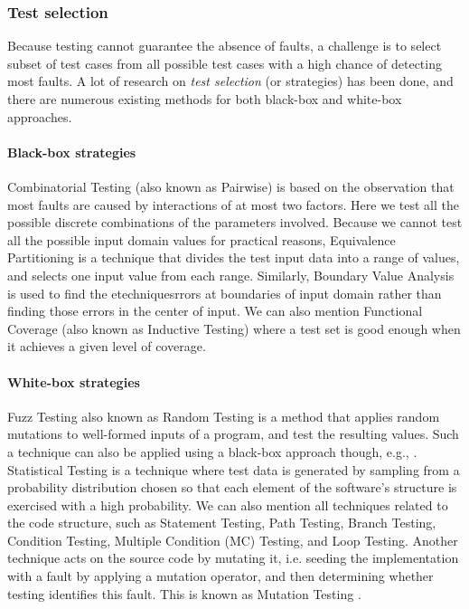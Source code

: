 \subsubsection{Test selection}

Because testing cannot guarantee the absence of faults, a
challenge is to select subset of test cases from all possible
test cases with a high chance of detecting most faults. A lot of
research on \textit{test selection} (or strategies) has been
done, and there are numerous existing methods for both black-box
and white-box approaches.

\paragraph{Black-box strategies} Combinatorial Testing (also
known as Pairwise) \cite{Tai98atest} is based on the observation
that most faults are caused by interactions of at most two
factors. Here we test all the possible discrete combinations of
the parameters involved.  Because we cannot test all the possible
input domain values for practical reasons, Equivalence
Partitioning \cite{Huang13} is a technique that divides the test
input data into a range of values, and selects one input value
from each range. Similarly, Boundary Value Analysis
\cite{Ramachandran:2003:TSC:942796.943301} is used to find the
etechniquesrrors at boundaries of input domain rather than finding those
errors in the center of input. We can also mention Functional
Coverage (also known as Inductive Testing)
\cite{Walkinshaw:2010:IFC:1928028.1928038} where a test set is
good enough when it achieves a given level of coverage.

\paragraph{White-box strategies} Fuzz Testing also known as
Random Testing
\cite{Duran:1981:RRT:800078.802530,Godefroid08automatedwhitebox}
is a method that applies random mutations to well-formed inputs
of a program, and test the resulting values. Such a technique can
also be applied using a black-box approach though, e.g.,
\cite{5387827}.  Statistical Testing
\cite{Walton:1995:STS:210453.210458} is a technique where test
data is generated by sampling from a probability distribution
chosen so that each element of the software's structure is
exercised with a high probability. We can also mention all
techniques related to the code structure, such as Statement
Testing, Path Testing, Branch Testing, Condition Testing,
Multiple Condition (MC) Testing, and Loop Testing.  Another
technique acts on the source code by mutating it, i.e.  seeding
the implementation with a fault by applying a mutation operator,
and then determining whether testing identifies this fault. This
is known as Mutation Testing \cite{1702444}.

